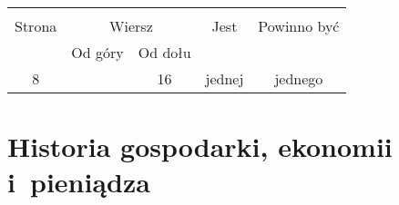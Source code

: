 \documentclass[a4paper,11pt]{article}
\begin{document}
\begin{center}

  \begin{tabular}{|c|c|c|c|c|}
    \hline
    & \multicolumn{2}{c|}{} & & \\
    Strona & \multicolumn{2}{c|}{Wiersz} & Jest
                              & Powinno być \\ \cline{2-3}
    & Od góry & Od dołu & & \\
    \hline
    8   & & 16 & jednej & jednego \\
    \hline
  \end{tabular}

\end{center}


\vspace{\spaceTwo}










\newpage
\section{Historia gospodarki, ekonomii i~pieniądza}

\vspace{\spaceTwo}





\end{document}

